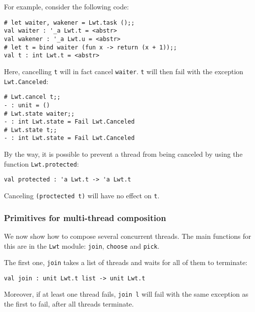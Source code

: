For example, consider the following code:



\lstset{language=[Objective]Caml}\begin{lstlisting}
# let waiter, wakener = Lwt.task ();;
val waiter : '_a Lwt.t = <abstr>
val wakener : '_a Lwt.u = <abstr>
# let t = bind waiter (fun x -> return (x + 1));;
val t : int Lwt.t = <abstr>
\end{lstlisting}
\medskip

\noindent
Here, cancelling {\tt t} will in fact cancel {\tt waiter}.
{\tt t} will then fail with the exception {\tt Lwt.Canceled}:



\lstset{language=[Objective]Caml}\begin{lstlisting}
# Lwt.cancel t;;
- : unit = ()
# Lwt.state waiter;;
- : int Lwt.state = Fail Lwt.Canceled
# Lwt.state t;;
- : int Lwt.state = Fail Lwt.Canceled
\end{lstlisting}
\medskip

\noindent
By the way, it is possible to prevent a thread from being canceled
by using the function {\tt Lwt.protected}:



\lstset{language=[Objective]Caml}\begin{lstlisting}
val protected : 'a Lwt.t -> 'a Lwt.t
\end{lstlisting}
\medskip

\noindent
Canceling {\tt (proctected t)} will have no effect on {\tt t}.



\subsubsection{ Primitives for multi-thread composition }

We now show how to compose several concurrent threads. The
main functions for this are in the {\tt Lwt} module: {\tt join},
{\tt choose} and {\tt pick}.



The first one, {\tt join} takes a list of threads and waits for all
of them to terminate:



\lstset{language=[Objective]Caml}\begin{lstlisting}
val join : unit Lwt.t list -> unit Lwt.t
\end{lstlisting}
\medskip

\noindent
Moreover, if at least one thread fails, {\tt join l} will fail with
the same exception as the first to fail, after all threads terminate.



